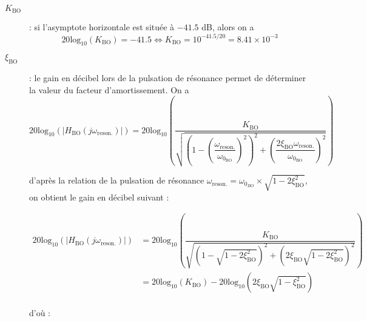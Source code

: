 \ifprof
\begin{corrige}
\begin{description}
\item[$K_\text{BO}$] : si l'asymptote horizontale est située à $-41.5$ dB, alors on a
$$ 20\text{log}_{10} (K_\text{BO}) = -41.5 \Leftrightarrow K_\text{BO} = 10^{-41.5/20} = 8.41 \times 10^{-3}$$

\item[$\xi_\text{BO}$] : le gain en décibel lors de la pulsation de résonance permet de déterminer la valeur du facteur d'amortissement. On a $20 \text{log}_{10} \left( \left| H_\text{BO}(j \omega_\text{reson.}) \right| \right)= 20 \text{log}_{10} \left( \dfrac{K_\text{BO}}{\sqrt{\left(  1 - \left( \dfrac{\omega_\text{reson.}}{\omega_{0_\text{BO}}} \right)^2\right)^2 +  \left(\dfrac{2 \xi_\text{BO} \omega_\text{reson.}}{\omega_{0_\text{BO}}}\right)^2} }\right)$

d'après la relation de la pulsation de résonance $\omega_\text{reson.} = \omega_{0_{BO}} \times \sqrt{1 - 2 \xi_\text{BO}^2}$, on obtient le gain en décibel suivant :

$\begin{array}{ll}
20 \text{log}_{10} \left( \left| H_\text{BO}(j \omega_\text{reson.}) \right| \right) &= 20 \text{log}_{10} \left( \dfrac{K_\text{BO}}{\sqrt{\left(  1 - \sqrt{1 - 2 \xi_\text{BO}^2}\right)^2 +  \left(2 \xi_\text{BO} \sqrt{1 - 2 \xi_\text{BO}^2}\right)^2} }\right)\\
 & = 20 \text{log}_{10} (K_\text{BO}) - 20 \text{log}_{10}\left( 2\xi_\text{BO} \sqrt{1 - \xi_\text{BO}^2}\right)\\
\end{array}
$

d'où :


\end{description}
\end{corrige}
